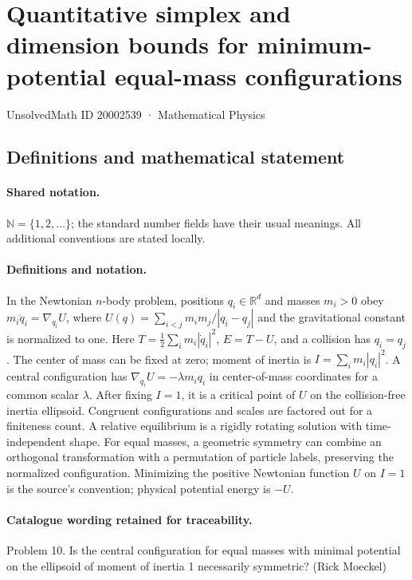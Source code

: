 \documentclass[11pt]{article}
\begin{document}
\setcounter{section}{20002538}
\section{Quantitative simplex and dimension bounds for minimum-potential equal-mass configurations}\label{20002539}
{\small UnsolvedMath ID 20002539 · Mathematical Physics}
\subsection{Definitions and mathematical statement}

\paragraph{Shared notation.}$\mathbb N=\{1,2,\ldots\}$; the standard number fields have their usual meanings. All additional conventions are stated locally.


\paragraph{Definitions and notation.}In the Newtonian $n$-body problem, positions $q_i\in\mathbb R^d$ and masses $m_i>0$ obey $m_i\ddot q_i=\nabla_{q_i}U$, where $U(q)=\sum_{i<j}m_im_j/|q_i-q_j|$ and the gravitational constant is normalized to one. Here $T=\tfrac12\sum_i m_i|\dot q_i|^2$, $E=T-U$, and a collision has $q_i=q_j$. The center of mass can be fixed at zero; moment of inertia is $I=\sum_i m_i|q_i|^2$. A central configuration has $\nabla_{q_i}U=-\lambda m_iq_i$ in center-of-mass coordinates for a common scalar $\lambda$. After fixing $I=1$, it is a critical point of $U$ on the collision-free inertia ellipsoid. Congruent configurations and scales are factored out for a finiteness count. A relative equilibrium is a rigidly rotating solution with time-independent shape. For equal masses, a geometric symmetry can combine an orthogonal transformation with a permutation of particle labels, preserving the normalized configuration. Minimizing the positive Newtonian function $U$ on $I=1$ is the source’s convention; physical potential energy is $-U$.

\paragraph{Catalogue wording retained for traceability.}
Problem 10. Is the central configuration for equal masses with minimal potential on the ellipsoid of moment of inertia 1 necessarily symmetric? (Rick Moeckel)
\end{document}
